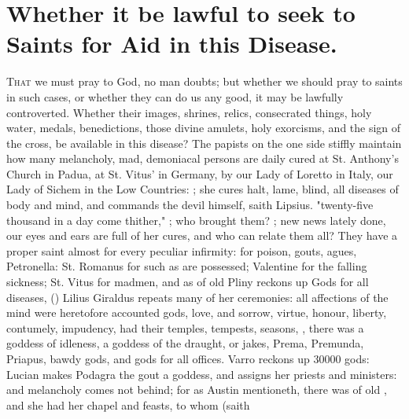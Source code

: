 {%

\section[Whether it be lawful to seek to Saints for Aid]{Whether it be lawful to seek to Saints for Aid in this Disease.}

\lettrine{T}{hat} we must pray to God, no man doubts; but whether we should
pray to saints in such cases, or whether they can do us any good, it may be
lawfully controverted. Whether their images, shrines, relics, consecrated
things, holy water, medals, benedictions, those divine amulets, holy exorcisms,
and the sign of the cross, be available in this disease? The papists on the one
side stiffly maintain how many melancholy, mad, demoniacal persons are daily
cured at St. Anthony's Church in Padua, at St. Vitus' in Germany, by our Lady
of Loretto in Italy, our Lady of Sichem in the Low Countries:
; she cures halt, lame, blind, all diseases of body
and mind, and commands the devil himself, saith Lipsius. "twenty-five thousand
in a day come thither," ; who brought them? ; new news lately done, our eyes and ears are full of her cures, and
who can relate them all? They have a proper saint almost for every peculiar
infirmity: for poison, gouts, agues, Petronella: St. Romanus for such as are
possessed; Valentine for the falling sickness; St. Vitus for madmen, \etc{} and
as of old Pliny reckons up Gods for all diseases,
() Lilius Giraldus repeats many of her ceremonies:
all affections of the mind were heretofore accounted gods,
love, and sorrow, virtue, honour, liberty, contumely,
impudency, had their temples, tempests, seasons, , there was a goddess of idleness, a goddess of the
draught, or jakes, Prema, Premunda, Priapus, bawdy gods, and gods for all
offices. Varro reckons up 30\thinspace{}000 gods: Lucian
makes Podagra the gout a goddess, and assigns her priests and ministers: and
melancholy comes not behind; for as Austin mentioneth,
 there was of old
, and she had her chapel and feasts, to whom (saith
}
